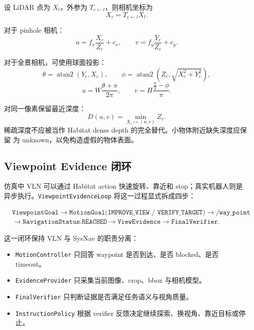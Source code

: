 \documentclass[UTF8,zihao=-4]{ctexart}
\begin{document}
设 LiDAR 点为 $X_l$，外参为 $T_{c\leftarrow l}$，则相机坐标为
\begin{equation}
  X_c = T_{c\leftarrow l}X_l.
\end{equation}

对于 pinhole 相机：
\begin{equation}
  u = f_x\frac{X_c}{Z_c}+c_x,
  \qquad
  v = f_y\frac{Y_c}{Z_c}+c_y.
\end{equation}

对于全景相机，可使用球面投影：
\begin{equation}
  \theta=\operatorname{atan2}(Y_c,X_c),
  \qquad
  \phi=\operatorname{atan2}(Z_c,\sqrt{X_c^2+Y_c^2}),
\end{equation}
\begin{equation}
  u=W\frac{\theta+\pi}{2\pi},
  \qquad
  v=H\frac{\frac{\pi}{2}-\phi}{\pi}.
\end{equation}

对同一像素保留最近深度：
\begin{equation}
  D(u,v)=\min_{X_c\mapsto(u,v)} Z_c.
\end{equation}
稀疏深度不应被当作 Habitat dense depth 的完全替代。小物体附近缺失深度应保留
为 unknown，以免构造虚假的物体表面。

\subsection{Viewpoint Evidence 闭环}

仿真中 VLN 可以通过 Habitat action 快速旋转、靠近和 stop；真实机器人则是
异步执行。\texttt{ViewpointEvidenceLoop} 将这一过程显式拆成四步：

\begin{equation}
\begin{aligned}
&\texttt{ViewpointGoal}
\rightarrow \texttt{MotionGoal(IMPROVE\_VIEW / VERIFY\_TARGET)}
\rightarrow \texttt{/way\_point} \\
&\rightarrow \texttt{NavigationStatus.REACHED}
\rightarrow \texttt{ViewEvidence}
\rightarrow \texttt{FinalVerifier}.
\end{aligned}
\end{equation}

这一闭环保持 VLN 与 SysNav 的职责分离：

\begin{itemize}[leftmargin=1.5em]
  \item \texttt{MotionController} 只回答 waypoint 是否到达、是否 blocked、是否 timeout。
  \item \texttt{EvidenceProvider} 只采集当前图像、crop、bbox 与相机模型。
  \item \texttt{FinalVerifier} 只判断证据是否满足任务语义与视角质量。
  \item \texttt{InstructionPolicy} 根据 verifier 反馈决定继续探索、换视角、靠近目标或停止。
\end{itemize}
\end{document}
